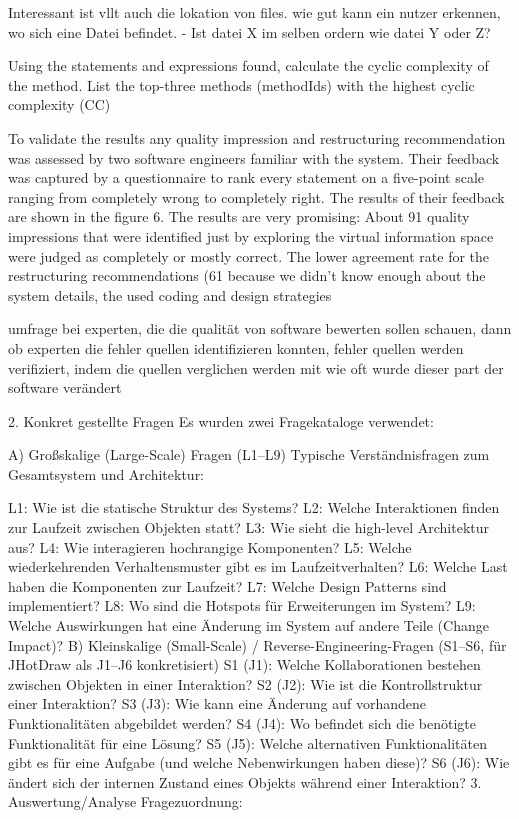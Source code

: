 Interessant ist vllt auch die lokation von files. wie gut kann ein nutzer erkennen, wo sich eine Datei befindet. - 
Ist datei X im selben ordern wie datei Y oder Z? 


\cite{visAnaSoftStructure}

Using the statements and expressions found, calculate the cyclic complexity of the method. List the top-three methods (methodIds)
with the highest cyclic complexity (CC)

\cite{metricsBased3DVisualization}
To validate the results any quality impression and restructuring recommendation was assessed by two software
engineers familiar with the system. Their feedback was
captured by a questionnaire to rank every statement on a
five-point scale ranging from completely wrong to completely right. The results of their feedback are shown in
the figure 6.
The results are very promising: About 91%
quality impressions that were identified just by exploring
the virtual information space were judged as completely
or mostly correct. The lower agreement rate for the restructuring recommendations (61%
because we didn’t know enough about the system details,
the used coding and design strategies



\cite{eQuality}
umfrage bei experten, die die qualität von software bewerten sollen
schauen, dann ob experten die fehler quellen identifizieren konnten, fehler quellen werden verifiziert, indem die quellen verglichen werden mit wie oft wurde dieser part der software verändert



\cite{pacione2003comparative}
2. Konkret gestellte Fragen
Es wurden zwei Fragekataloge verwendet:

A) Großskalige (Large-Scale) Fragen (L1–L9)
Typische Verständnisfragen zum Gesamtsystem und Architektur:

L1: Wie ist die statische Struktur des Systems?
L2: Welche Interaktionen finden zur Laufzeit zwischen Objekten statt?
L3: Wie sieht die high-level Architektur aus?
L4: Wie interagieren hochrangige Komponenten?
L5: Welche wiederkehrenden Verhaltensmuster gibt es im Laufzeitverhalten?
L6: Welche Last haben die Komponenten zur Laufzeit?
L7: Welche Design Patterns sind implementiert?
L8: Wo sind die Hotspots für Erweiterungen im System?
L9: Welche Auswirkungen hat eine Änderung im System auf andere Teile (Change Impact)?
B) Kleinskalige (Small-Scale) / Reverse-Engineering-Fragen (S1–S6, für JHotDraw als J1–J6 konkretisiert)
S1 (J1): Welche Kollaborationen bestehen zwischen Objekten in einer Interaktion?
S2 (J2): Wie ist die Kontrollstruktur einer Interaktion?
S3 (J3): Wie kann eine Änderung auf vorhandene Funktionalitäten abgebildet werden?
S4 (J4): Wo befindet sich die benötigte Funktionalität für eine Lösung?
S5 (J5): Welche alternativen Funktionalitäten gibt es für eine Aufgabe (und welche Nebenwirkungen haben diese)?
S6 (J6): Wie ändert sich der internen Zustand eines Objekts während einer Interaktion?
3. Auswertung/Analyse
Fragezuordnung:

